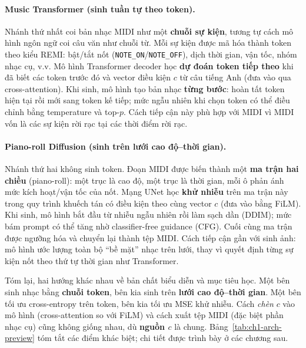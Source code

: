 \paragraph{Music Transformer (sinh tuần tự theo token).}
Nhánh thứ nhất coi bản nhạc MIDI như một \textbf{chuỗi sự kiện}, tương tự cách mô hình ngôn ngữ coi câu văn như chuỗi từ. Mỗi sự kiện được mã hóa thành token theo kiểu REMI: bật/tắt nốt (\texttt{NOTE\_ON}/\texttt{NOTE\_OFF}), dịch thời gian, vận tốc, nhóm nhạc cụ, v.v. Mô hình Transformer decoder học \textbf{dự đoán token tiếp theo} khi đã biết các token trước đó và vector điều kiện $c$ từ câu tiếng Anh (đưa vào qua cross-attention). Khi sinh, mô hình tạo bản nhạc \textbf{từng bước}: hoàn tất token hiện tại rồi mới sang token kế tiếp; mức ngẫu nhiên khi chọn token có thể điều chỉnh bằng temperature và top-$p$. Cách tiếp cận này phù hợp với MIDI vì MIDI vốn là các sự kiện rời rạc tại các thời điểm rời rạc.

\paragraph{Piano-roll Diffusion (sinh trên lưới cao độ--thời gian).}
Nhánh thứ hai không sinh token. Đoạn MIDI được biến thành một \textbf{ma trận hai chiều} (piano-roll): một trục là cao độ, một trục là thời gian, mỗi ô phản ánh mức kích hoạt/vận tốc của nốt. Mạng UNet học \textbf{khử nhiễu} trên ma trận này trong quy trình khuếch tán có điều kiện theo cùng vector $c$ (đưa vào bằng FiLM). Khi sinh, mô hình bắt đầu từ nhiễu ngẫu nhiên rồi làm sạch dần (DDIM); mức bám prompt có thể tăng nhờ classifier-free guidance (CFG). Cuối cùng ma trận được ngưỡng hóa và chuyển lại thành tệp MIDI. Cách tiếp cận gần với sinh ảnh: mô hình ước lượng toàn bộ ``bề mặt'' nhạc trên lưới, thay vì quyết định từng sự kiện nốt theo thứ tự thời gian như Transformer.

Tóm lại, hai hướng khác nhau về bản chất biểu diễn và mục tiêu học. Một bên sinh nhạc bằng \textbf{chuỗi token}, bên kia sinh trên \textbf{lưới cao độ--thời gian}. Một bên tối ưu cross-entropy trên token, bên kia tối ưu MSE khử nhiễu. Cách \textit{chèn} $c$ vào mô hình (cross-attention so với FiLM) và cách xuất tệp MIDI (đặc biệt phần nhạc cụ) cũng không giống nhau, dù \textbf{nguồn $c$} là chung. Bảng~\ref{tab:ch1-arch-preview} tóm tắt các điểm khác biệt; chi tiết được trình bày ở các chương sau.

